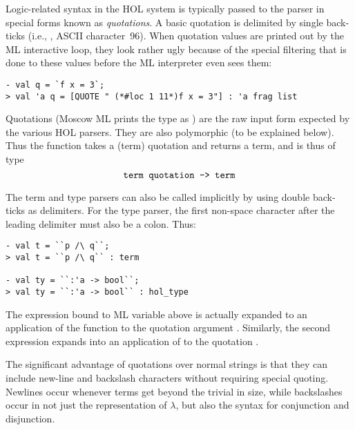 Logic-related syntax in the HOL system is typically passed to the
parser in special forms known as \emph{quotations}.  A basic quotation
is delimited by single back-ticks (i.e., , ASCII character~96).  When
quotation values are printed out by the ML interactive loop, they look
rather ugly because of the special filtering that is done to these
values before the ML interpreter even sees them:
\setcounter{sessioncount}{0}
\begin{session}
\begin{verbatim}
- val q = `f x = 3`;
> val 'a q = [QUOTE " (*#loc 1 11*)f x = 3"] : 'a frag list
\end{verbatim}
\end{session}
Quotations (Moscow ML prints the type as ) are the
raw input form expected by the various HOL parsers.  They are also
polymorphic (to be explained below).  Thus the function
 takes a (term) quotation and returns a term,
and is thus of type \[ \ml{term quotation -> term}
\]

The term and type parsers can also be called implicitly by using
double back-ticks as delimiters.  For the type parser, the first
non-space character after the leading delimiter must also be a colon.
Thus:
\begin{session}
\begin{verbatim}
- val t = ``p /\ q``;
> val t = ``p /\ q`` : term

- val ty = ``:'a -> bool``;
> val ty = ``:'a -> bool`` : hol_type
\end{verbatim}
\end{session}

The expression bound to ML variable  above is actually expanded
to an application of the function  to the quotation
argument .  Similarly, the second expression expands
into an application of  to the quotation .

The significant advantage of quotations over normal \ML{} strings is
that they can include new-line and backslash characters without
requiring special quoting.  Newlines occur whenever terms get beyond
the trivial in size, while backslashes occur in not just the
representation of $\lambda$, but also the syntax for conjunction and
disjunction.

